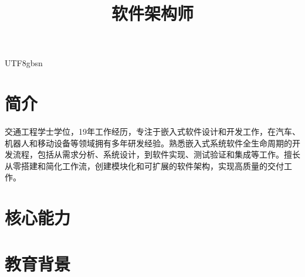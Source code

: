 \documentclass[10pt,a4paper,mono]{moderncv}   %
\title{软件架构师}                      %
\begin{document}
\ifxetexorluatex{}
\else
  \begin{CJK*}{UTF8}{gbsn}                          %
  \fi


  \makecvtitle{}

  \section{简介}
  交通工程学士学位，19年工作经历，专注于嵌入式软件设计和开发工作，在汽车、机器人和移动设备等领域拥有多年研发经验。熟悉嵌入式系统软件全生命周期的开发流程，包括从需求分析、系统设计，到软件实现、测试验证和集成等工作。擅长从零搭建和简化工作流，创建模块化和可扩展的软件架构，实现高质量的交付工作。

  \section{核心能力}

  \section{教育背景}




\end{CJK*}
\end{document}
